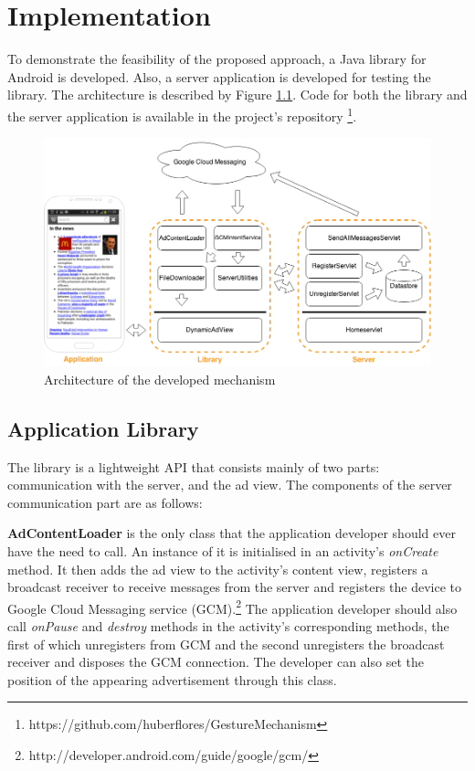 \chapter{Implementation}

To demonstrate the feasibility of the proposed approach, a Java library for Android is developed. Also, a server application is developed for testing the library. The architecture is described by Figure \ref{fig:architecture}. Code for both the library and the server application is available in the project's repository \footnote{https://github.com/huberflores/GestureMechanism}.

\begin{figure}
\begin{center}
\includegraphics[scale=0.41]{Images/client-server.png}
\caption{Architecture of the developed mechanism}
\label{fig:architecture}
\end{center}
\end{figure}

\section{Application Library}

The library is a lightweight API that consists mainly of two parts: communication with the server,  and the ad view. The components of the server communication part are as follows:

\textbf{AdContentLoader} is the only class that the application developer should ever have the need to call. An instance of it is initialised in an activity's \textit{onCreate} method. It then adds the ad view to the activity's content view, registers a broadcast receiver to receive messages from the server and registers the device to Google Cloud Messaging service (GCM).\footnote{http://developer.android.com/guide/google/gcm/} The application developer should also call \textit{onPause} and \textit{destroy} methods in the activity's corresponding methods, the first of which unregisters from GCM and the second unregisters the broadcast receiver and disposes the GCM connection. The developer can also set the position of the appearing advertisement through this class.

